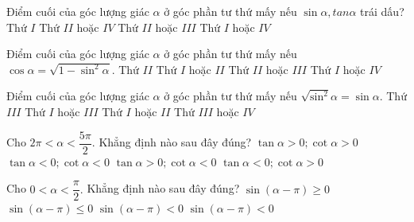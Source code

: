 \begin{ex}%
Điểm cuối của góc lượng giác $\alpha $ ở góc phần tư thứ mấy nếu $\sin \alpha, tan\alpha $ trái dấu? 
\choice
{Thứ $ I$}
{Thứ $ II$ hoặc $ IV$}
{\True Thứ $ II$ hoặc $ III$}
{Thứ $ I$ hoặc $ IV$}
\loigiai{
 } 
\end{ex}

\begin{ex}%
Điểm cuối của góc lượng giác $\alpha $ ở góc phần tư thứ mấy nếu $\cos \alpha =\sqrt{{1-{\sin}^2\alpha}}.$
\choice
{Thứ $ II$}
{Thứ $ I$ hoặc $ II$}
{Thứ $ II$ hoặc $ III$}
{\True Thứ $ I$ hoặc $ IV$}
\end{ex}

\begin{ex}%
Điểm cuối của góc lượng giác $\alpha $ ở góc phần tư thứ mấy nếu $\sqrt{{{\sin}^2}}\alpha =\sin \alpha.$
\choice
{Thứ $ III$}
{Thứ $ I$ hoặc $ III$}
{\True Thứ $ I$ hoặc $ II$}
{Thứ $ III$ hoặc $ IV$}
 \end{ex}

\begin{ex}%
Cho $2\pi <\alpha <\dfrac{{5\pi}}{2}.$ Khẳng định nào sau đây đúng?
\choice
{\True $\tan \alpha >0; \cot \alpha >0$}
{$\tan \alpha <0; \cot \alpha <0$}
{$\tan \alpha >0; \cot \alpha <0$}
{$\tan \alpha <0; \cot \alpha >0$}
 \end{ex}

\begin{ex}%
Cho $0<\alpha <\dfrac{\pi}{2}.$ Khẳng định nào sau đây đúng?
\choice
{$\sin \left({\alpha-\pi}\right)\geqslant 0$}
{$\sin \left({\alpha-\pi}\right)\leqslant 0$}
{$\sin \left({\alpha-\pi}\right)<0$}
{\True $\sin \left({\alpha-\pi}\right)<0$}
\end{ex}


